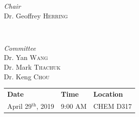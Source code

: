 \documentclass[titlepage,11pt]{article}
\begin{document}
\begin{titlepage}
	\vspace{1cm}
	
	\begin{minipage}{0.4\textwidth}
		\begin{flushleft}
			\large
			\textit{Chair}\\
			Dr. Geoffrey \textsc{Herring} %
		\end{flushleft}
	\end{minipage}
	~
	\begin{minipage}{0.4\textwidth}
		\begin{flushright}
			\large
			\textit{Committee}\\
			Dr. Yan \textsc{Wang}\\ %
			Dr. Mark \textsc{Thachuk}\\ %
			Dr. Keng \textsc{Chou} %
		\end{flushright}
	\end{minipage}
	
	
	\vfill\vfill\vfill %
	
	{\large
		\begin{table}[H]
			\centering
			\begin{tabular}{lll}
				\textbf{Date} & \textbf{Time} & \textbf{Location} \\
				April 29$^{\text{th}}$, 2019 & 9:00 AM & CHEM D317
			\end{tabular}
		\end{table}
	}
	
	
	
	\vfill %
	
\end{titlepage}

\justifying
\doublespacing
\end{document}
